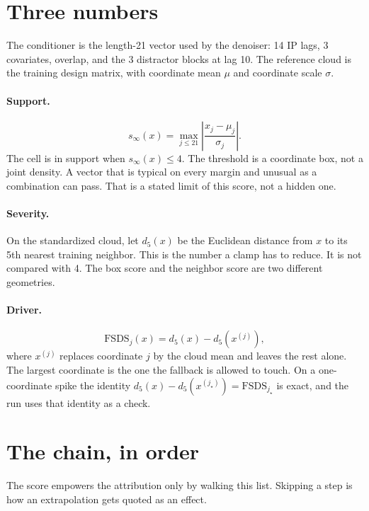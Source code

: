 \documentclass[11pt]{article}
\begin{document}
\section{Three numbers}

The conditioner is the length-21 vector used by the denoiser: 14 IP lags, 3 covariates, overlap, and the 3 distractor blocks at lag 10.
The reference cloud is the training design matrix, with coordinate mean $\mu$ and coordinate scale $\sigma$.

\paragraph{Support.}
\[
s_{\infty}(x)
=
\max_{j\le 21}
\left|
\frac{x_{j}-\mu_{j}}{\sigma_{j}}
\right|.
\]
The cell is in support when $s_{\infty}(x)\le 4$.
The threshold is a coordinate box, not a joint density.
A vector that is typical on every margin and unusual as a combination can pass.
That is a stated limit of this score, not a hidden one.

\paragraph{Severity.}
On the standardized cloud, let $d_{5}(x)$ be the Euclidean distance from $x$ to its 5th nearest training neighbor.
This is the number a clamp has to reduce.
It is not compared with 4.
The box score and the neighbor score are two different geometries.

\paragraph{Driver.}
\[
\mathrm{FSDS}_{j}(x)
=
d_{5}(x)
-
d_{5}(x^{(j)}),
\]
where $x^{(j)}$ replaces coordinate $j$ by the cloud mean and leaves the rest alone.
The largest coordinate is the one the fallback is allowed to touch.
On a one-coordinate spike the identity $d_{5}(x)-d_{5}(x^{(j_{\star})})=\mathrm{FSDS}_{j_{\star}}$ is exact, and the run uses that identity as a check.

\section{The chain, in order}

The score empowers the attribution only by walking this list.
Skipping a step is how an extrapolation gets quoted as an effect.
\end{document}
